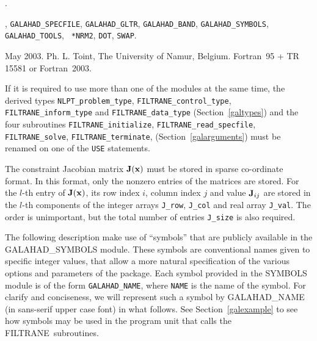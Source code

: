 \documentclass{galahad}
\newcommand{\packagename}{FILTRANE}
\newcommand{\fullpackagename}{\libraryname\_\packagename}
\newcommand{\sym}{\sf\small}
\begin{document}

\galattributes
\galversions{\tt  \fullpackagename\_single, \fullpackagename\_double}.

, {\tt GALAHAD\_SPECFILE}, {\tt GALAHAD\_GLTR},
{\tt GALAHAD\_BAND}, {\tt GALAHAD\_SYMBOLS}, {\tt GALAHAD\_TOOLS}, {\tt
*NRM2}, {\tt *DOT}, {\tt *SWAP}.

\galdate May 2003.
\galorigin Ph. L. Toint, The University of Namur, Belgium.
\gallanguage Fortran~95 + TR 15581 or Fortran~2003. 


\galhowto



\noindent
If it is required to use more than one of the modules at the same time, 
the derived types
{\tt NLPT\_problem\_type}, 
{\tt \packagename\_control\_type}, 
{\tt \packagename\_inform\_type} 
and
{\tt \packagename\_data\_type}
(Section~\ref{galtypes})
and the four subroutines
{\tt \packagename\_initialize}, 
{\tt \packagename\_read\_specfile}, 
{\tt \packagename\_solve}, 
{\tt \packagename\_terminate}, 
(Section~\ref{galarguments})
must be renamed on one of the {\tt USE} statements.


\galmatrix

The constraint Jacobian matrix ${\mathbf{J}}({\mathbf{x}})$ must be stored in sparse
co-ordinate format.  In this format, only the nonzero entries of the matrices
are stored. For the $l$-th entry of ${\mathbf{J}}({\mathbf{x}})$, its row index $i$, column
index $j$ and value ${\mathbf{J}}_{ij}$ are stored in the $l$-th components of the
integer arrays {\tt J\_row}, {\tt J\_col} and real array {\tt J\_val}.  The
order is unimportant, but the total number of entries {\tt J\_size} is also
required.





\galsymbols

The following description make use of ``symbols'' that are publicly available
in the GALAHAD\_SYMBOLS module. These symbols are conventional names given to
specific integer values, that allow a more natural specification of the
various options and parameters of the package.  Each symbol provided in the
SYMBOLS module is of the form {\tt GALAHAD\_NAME}, where {\tt NAME} is the name
of the symbol.  For clarify and conciseness, we will represent such a symbol
by {\sym GALAHAD\_NAME} (in sans-serif upper case font) in what follows. See
Section~\ref{galexample} to see how symbols may be used in the program unit
that calls the \packagename\ subroutines.
\end{document}
